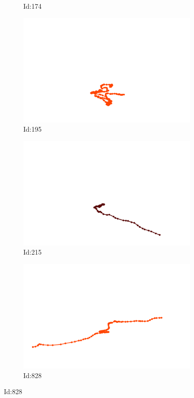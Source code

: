 \documentclass[12pt,twoside]{report}
\begin{document}
\begin{figure}
\begin{subfigure}[b]{0.20\textwidth}
\caption{Id:174}
\end{subfigure}
\begin{subfigure}[b]{0.20\textwidth}
\centering
\includegraphics[width=\textwidth]{../../trajectories/195.png}
\caption{Id:195}
\end{subfigure}
\begin{subfigure}[b]{0.20\textwidth}
\centering
\includegraphics[width=\textwidth]{../../trajectories/215.png}
\caption{Id:215}
\end{subfigure}
\begin{subfigure}[b]{0.20\textwidth}
\centering
\includegraphics[width=\textwidth]{../../trajectories/828.png}
\caption{Id:828}
\end{subfigure}
\end{figure}
\end{document}
